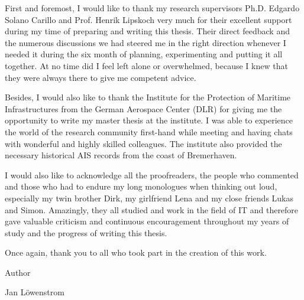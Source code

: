 First and foremost, I would like to thank my research supervisors Ph.D. Edgardo Solano Carillo and Prof. Henrik Lipskoch very much for their excellent support during my time of preparing and writing this thesis. Their direct feedback and the numerous discussions we had steered me in the right direction whenever I needed it during the six month of planning, experimenting and putting it all together. At no time did I feel left alone or overwhelmed, because I knew that they were always there to give me competent advice.
\par
Besides, I would also like to thank the Institute for the Protection of Maritime Infrastructures from the German Aerospace Center (DLR) for giving me the opportunity to write my master thesis at the institute. I was able to experience the world of the research community first-hand while meeting and having chats with wonderful and highly skilled colleagues. The institute also provided the necessary historical AIS records from the coast of Bremerhaven.
\par
I would also like to acknowledge all the proofreaders, the people who commented and those who had to endure my long monologues when thinking out loud, especially my twin brother Dirk, my girlfriend Lena and my close friends Lukas and Simon. Amazingly, they all studied and work in the field of IT and therefore gave valuable criticism and continuous encouragement throughout my years of study and the progress of writing this thesis.
\par
Once again, thank you to all who took part in the creation of this work.
\par
Author
\par
Jan Löwenstrom